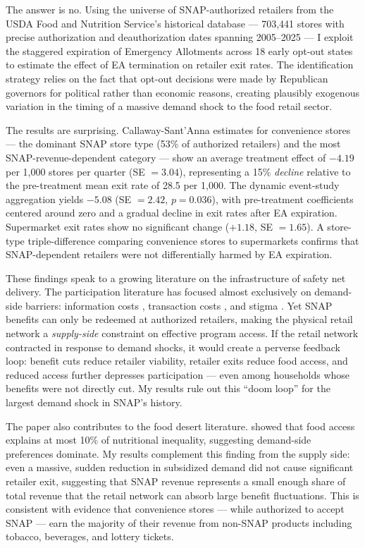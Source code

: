 \documentclass[12pt]{article}
\begin{document}
The answer is no. Using the universe of SNAP-authorized retailers from the USDA Food and Nutrition Service's historical database --- 703,441 stores with precise authorization and deauthorization dates spanning 2005--2025 --- I exploit the staggered expiration of Emergency Allotments across 18 early opt-out states to estimate the effect of EA termination on retailer exit rates. The identification strategy relies on the fact that opt-out decisions were made by Republican governors for political rather than economic reasons, creating plausibly exogenous variation in the timing of a massive demand shock to the food retail sector.

The results are surprising. Callaway-Sant'Anna estimates for convenience stores --- the dominant SNAP store type (53\% of authorized retailers) and the most SNAP-revenue-dependent category --- show an average treatment effect of $-4.19$ per 1,000 stores per quarter (SE $= 3.04$), representing a 15\% \textit{decline} relative to the pre-treatment mean exit rate of 28.5 per 1,000. The dynamic event-study aggregation yields $-5.08$ (SE $= 2.42$, $p = 0.036$), with pre-treatment coefficients centered around zero and a gradual decline in exit rates after EA expiration. Supermarket exit rates show no significant change ($+1.18$, SE $= 1.65$). A store-type triple-difference comparing convenience stores to supermarkets confirms that SNAP-dependent retailers were not differentially harmed by EA expiration.

These findings speak to a growing literature on the infrastructure of safety net delivery. The participation literature has focused almost exclusively on demand-side barriers: information costs \citep{finkelstein2019take}, transaction costs \citep{currie2003struggle}, and stigma \citep{klerman2012understanding}. Yet SNAP benefits can only be redeemed at authorized retailers, making the physical retail network a \textit{supply-side} constraint on effective program access. If the retail network contracted in response to demand shocks, it would create a perverse feedback loop: benefit cuts reduce retailer viability, retailer exits reduce food access, and reduced access further depresses participation --- even among households whose benefits were not directly cut. My results rule out this ``doom loop'' for the largest demand shock in SNAP's history.

The paper also contributes to the food desert literature. \citet{allcott2019food} showed that food access explains at most 10\% of nutritional inequality, suggesting demand-side preferences dominate. My results complement this finding from the supply side: even a massive, sudden reduction in subsidized demand did not cause significant retailer exit, suggesting that SNAP revenue represents a small enough share of total revenue that the retail network can absorb large benefit fluctuations. This is consistent with evidence that convenience stores --- while authorized to accept SNAP --- earn the majority of their revenue from non-SNAP products including tobacco, beverages, and lottery tickets.
\end{document}
